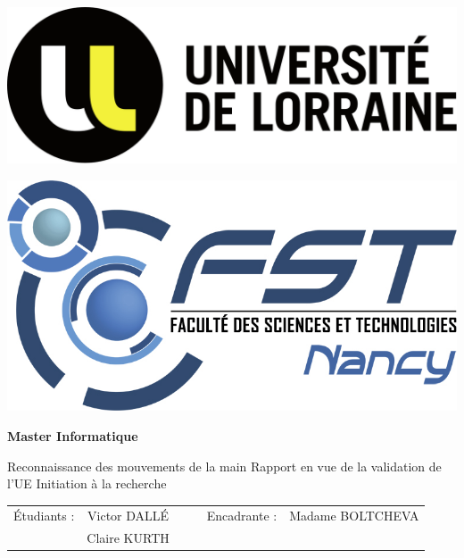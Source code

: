 \documentclass[11pt]{article}
\begin{document}
\begin{titlepage}
    \begin{center}

        \begin{minipage}[b]{0.3\textwidth}
            \includegraphics[width=\textwidth]{images/Logo_Universite_de_Lorraine.png}
        \end{minipage}
        \begin{minipage}[b]{0.2\textwidth}
            \centering
            \includegraphics[width=\textwidth]{images/logo-fst-format-jpg-couleur.jpg}
        \end{minipage}
        \smallbreak
        \vspace{0.5cm}
        \textbf{\large Master Informatique}

        \vfill
        {\Large Reconnaissance des mouvements de la main} \smallbreak
        Rapport \smallbreak en vue de la validation de l'UE Initiation à la recherche \smallbreak
        \vfill
        \begin{tabular}{ccc|ccc}
            \'Etudiants : & Victor DALL\'E &  &  & Encadrante : & Madame BOLTCHEVA \\
                          & Claire KURTH   &  &  &              &
        \end{tabular}
    \end{center}

\end{titlepage}
\end{document}
